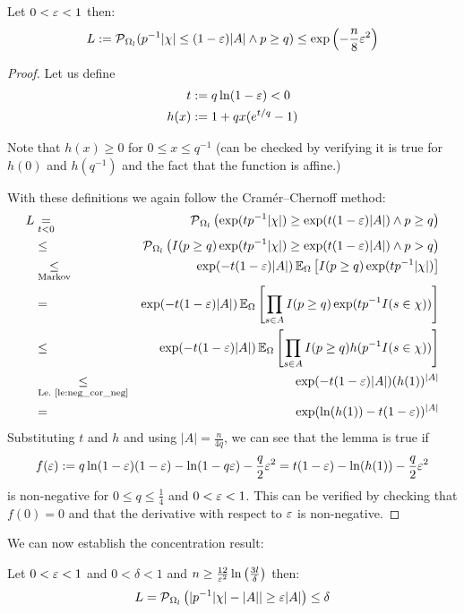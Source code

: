 \begin{lemma}\label{le:lower_tail}
Let $0 < \varepsilon < 1$ then:
\[
  L := \operatorname{\mathcal P}_{\Omega_l} ( p^{-1} |\chi| \leq (1-\varepsilon)|A| \wedge p \geq q) \leq
    \exp\left(-\frac{n}{8} \varepsilon^2\right)
\]
\end{lemma}
\begin{proof}
Let us define
\begin{align*}
  t & := q \ln(1-\varepsilon) < 0 \\
  h(x) & := 1+q x (e^{t/q}-1)  
\end{align*}

Note that $h(x) \geq 0$ for $0 \leq x \leq q^{-1}$ (can be checked by verifying it is true for
$h(0)$ and $h(q^{-1})$ and the fact that the function is affine.)

With these definitions we again follow the Cram\'{e}r--Chernoff method:
{\allowdisplaybreaks
\begin{eqnarray*}
  L & \underset{t<0}{=} & \operatorname{\mathcal P}_{\Omega_l} \left( \exp(t p^{-1} |\chi|) \geq
    \exp(t (1-\varepsilon)|A|) \wedge p \geq q \right) \\
    & \leq & \operatorname{\mathcal P}_{\Omega_l} \left( I(p \geq q) \exp(t p^{-1} |\chi|) \geq
    \exp(t (1-\varepsilon)|A|) \wedge p > q \right) \\
    & \underset{\textrm{Markov}}{\leq} & \exp( -t (1-\varepsilon) |A| )
    \operatorname{\mathbb E}_\Omega \left[ I(p \geq q) \exp ( t p^{-1} |\chi| ) \right] \\
    & = & \exp( -t (1-\varepsilon) |A| ) \operatorname{\mathbb E}_\Omega \left[ \prod_{s \in A} I(p \geq q) 
      \exp ( t p^{-1} I(s \in \chi) ) \right] \\
    & \leq & \exp( -t (1-\varepsilon) |A| ) \operatorname{\mathbb E}_\Omega 
      \left[ \prod_{s \in A} I(p \geq q) h( p^{-1} I(s \in \chi) ) \right] \\
    & \underset{\textrm{Le.~\ref{le:neg_cor_neg}}}{\leq} & \exp( -t (1-\varepsilon) |A| ) (h(1))^{|A|} \\
    & = & \exp( \ln(h(1)) -t (1-\varepsilon) )^{|A|}
\end{eqnarray*}
}
Substituting $t$ and $h$ and using $|A| = \frac{n}{4q}$, we can see that the lemma is true if
\[
  f(\varepsilon) := q \ln(1-\varepsilon) (1-\varepsilon) -\ln(1 - q \varepsilon) - \frac{q}{2}\varepsilon^2 =
  t (1-\varepsilon) - \ln(h(1)) - \frac{q}{2} \varepsilon^2
\]
is non-negative for $0 \leq q \leq \frac{1}{4}$ and $0 < \varepsilon < 1$.
This can be verified by checking that $f(0) = 0$ and that the derivative with respect to $\varepsilon$ is
non-negative.
\end{proof}
We can now establish the concentration result:
\begin{theorem}\label{th:concentration}
Let $0 < \varepsilon < 1$ and $0 < \delta < 1$ and
$n \geq \frac{12}{\varepsilon^2} \ln\left(\frac{3l}{\delta}\right)$ then:
\[
  L = \operatorname{\mathcal P}_{\Omega_l} \left( | p^{-1} |\chi| - |A| | \geq \varepsilon |A| \right) \leq \delta
\]
\end{theorem}
